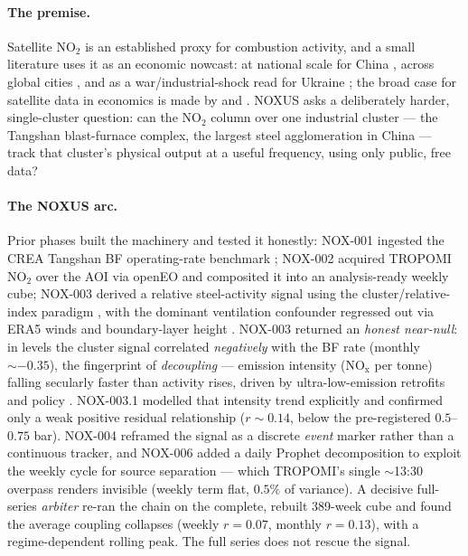 \documentclass[11pt,a4paper]{article}
\newcommand{\rval}[1]{\mbox{$r=#1$}}
\providecommand{\ce}[1]{\ensuremath{\mathrm{#1}}}
\begin{document}
\paragraph{The premise.} Satellite \ce{NO_2} is an established proxy for combustion activity,
and a small literature uses it as an economic nowcast: at national scale for China
\citep{morris_zhang_2019,li_zheng_2023,li_2024_nox_trends}, across global cities
\citep{montgomery_holloway_2018}, and as a war/industrial-shock read for Ukraine
\citep{mao_2025_ukraine}; the broad case for satellite data in economics is made by
\citet{donaldson_storeygard_2016} and \citet{ezran_2023}. NOXUS asks a deliberately harder,
single-cluster question: can the \ce{NO_2} column over one industrial cluster --- the
Tangshan blast-furnace complex, the largest steel agglomeration in China --- track that
cluster's physical output at a useful frequency, using only public, free data?

\paragraph{The NOXUS arc.} Prior phases built the machinery and tested it honestly:
NOX-001 ingested the CREA Tangshan BF operating-rate benchmark \citep{crea_steel_benchmark};
NOX-002 acquired TROPOMI \ce{NO_2} over the AOI via openEO and composited it into an
analysis-ready weekly cube; NOX-003 derived a relative steel-activity signal using the
cluster/relative-index paradigm \citep{kim_2023}, with the dominant ventilation confounder
regressed out via ERA5 winds and boundary-layer height
\citep{hersbach_2020_era5,cds_era5,li_2024_nox_trends}. NOX-003 returned an
\emph{honest near-null}: in levels the cluster signal correlated \emph{negatively} with the
BF rate (monthly $\sim-0.35$), the fingerprint of \emph{decoupling} --- emission intensity
(\ce{NO_x} per tonne) falling secularly faster than activity rises, driven by
ultra-low-emission retrofits and policy \citep{li_2024_nox_trends}. NOX-003.1 modelled that
intensity trend explicitly and confirmed only a weak positive residual relationship
($r\!\sim\!0.14$, below the pre-registered $0.5$--$0.75$ bar). NOX-004 reframed the signal as
a discrete \emph{event} marker rather than a continuous tracker, and NOX-006 added a daily
Prophet decomposition to exploit the weekly cycle for source separation --- which TROPOMI's
single $\sim$13:30 overpass renders invisible (weekly term flat, $0.5\%$ of variance).
A decisive full-series \emph{arbiter} re-ran the chain on the complete, rebuilt 389-week cube
and found the average coupling collapses (weekly \rval{0.07}, monthly \rval{0.13}), with a
regime-dependent rolling peak. The full series does not rescue the signal.
\end{document}
